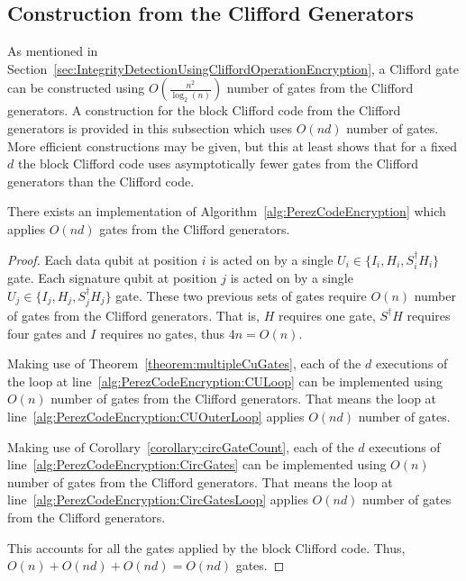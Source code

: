 \subsection{Construction from the Clifford Generators}
As mentioned in Section~\ref{sec:IntegrityDetectionUsingCliffordOperationEncryption}, a Clifford gate can be constructed using $O\left(\frac{n^2}{\log_2 (n)}\right)$ number of gates from the Clifford generators. A construction for the block Clifford code from the Clifford generators is provided in this subsection which uses $O(nd)$ number of gates. More efficient constructions may be given, but this at least shows that for a fixed $d$ the block Clifford code uses asymptotically fewer gates from the Clifford generators than the Clifford code.
\begin{theorem}
There exists an implementation of Algorithm~\ref{alg:PerezCodeEncryption} which applies $O \left(nd \right)$ gates from the Clifford generators.
\end{theorem}
\begin{proof}
Each data qubit at position $i$ is acted on by a single $U_i \in \{I_i, H_i, S_i^{\dagger}H_i\}$ gate. Each signature qubit at position $j$ is acted on by a single $U_j \in \{I_j, H_j, S_j^{\dagger}H_j\}$ gate. These two previous sets of gates require $O \left(n \right)$ number of gates from the Clifford generators. That is, $H$ requires one gate, $S^{\dagger}H$ requires four gates and $I$ requires no gates, thus $4n = O \left(n \right)$.

Making use of Theorem~\ref{theorem:multipleCuGates}, each of the $d$ executions of the loop at line~\ref{alg:PerezCodeEncryption:CULoop} can be implemented using $O \left(n \right)$ number of gates from the Clifford generators. That means the loop at line~\ref{alg:PerezCodeEncryption:CUOuterLoop} applies $O \left(nd \right)$ number of gates.

Making use of Corollary~\ref{corollary:circGateCount}, each of the $d$ executions of line~\ref{alg:PerezCodeEncryption:CircGates} can be implemented using $O \left(n \right)$ number of gates from the Clifford generators. That means the loop at line~\ref{alg:PerezCodeEncryption:CircGatesLoop} applies $O \left(nd \right)$ number of gates from the Clifford generators.

This accounts for all the gates applied by the block Clifford code. Thus, $O\left(n \right) + O\left(nd\right) + O\left(nd\right) = O\left(nd\right)$ gates.
\end{proof}

